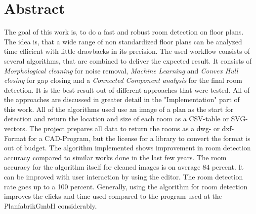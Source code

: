 \section{Abstract}
The goal of this work is, to do a fast and robust room detection on floor plans. The idea is, that a wide range of non standardized floor plans can be analyzed time efficient with little drawbacks in its precision.
The used workflow consists of several algorithms, that are combined to deliver the expected result. It consists of \textit{Morphological cleaning} for noise removal, \textit{Machine Learning} and \textit{Convex Hull closing} for gap closing and a \textit{Connected Component analysis} for the final room detection. It is the best result out of different approaches that were tested. All of the approaches are discussed in greater detail in the "Implementation" part of this work. All of the algorithms used use an image of a plan  as the start for detection and return the location and size of each room as a CSV-table or SVG-vectors. The project prepares all data to return the rooms as a dwg- or dxf-Format for a CAD-Program, but the license for a library to convert the format is out of budget.
The algorithm implemented shows improvement in room detection accuracy compared to similar works done in the last few years. The room accuracy for the algorithm itself for cleaned images is on average 84 percent. It can be improved with user interaction by using the editor. The room detection rate goes up to a 100 percent. Generally, using the algorithm for room detection improves the clicks and time used compared to the program used at the PlanfabrikGmbH considerably.